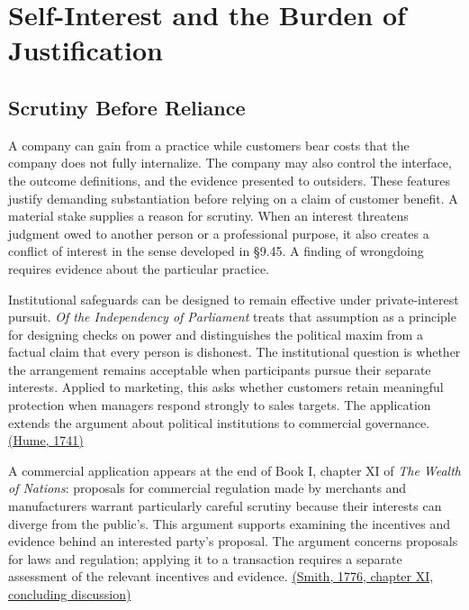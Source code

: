 
\hypertarget{M09-self-interest-and-the-burden-of-justification}{%
\section{Self-Interest and the Burden of
Justification}\label{M09-self-interest-and-the-burden-of-justification}}

\noindent \hypertarget{M09-scrutiny-before-reliance}{%
\subsection{Scrutiny Before
Reliance}\label{M09-scrutiny-before-reliance}}

\noindent \noindent A company can gain from a practice while customers bear costs
that the company does not fully internalize. The company may also
control the interface, the outcome definitions, and the evidence
presented to outsiders. These features justify demanding substantiation
before relying on a claim of customer benefit. A material stake supplies
a reason for scrutiny. When an interest threatens judgment owed to
another person or a professional purpose, it also creates a conflict of
interest in the sense developed in §9.45. A finding of wrongdoing
requires evidence about the particular practice.

Institutional safeguards can be designed to remain effective under
private-interest pursuit. \emph{Of the Independency of Parliament}
treats that assumption as a principle for designing checks on power and
distinguishes the political maxim from a factual claim that every person
is dishonest. The institutional question is whether the arrangement
remains acceptable when participants pursue their separate interests.
Applied to marketing, this asks whether customers retain meaningful
protection when managers respond strongly to sales targets. The
application extends the argument about political institutions to
commercial governance. \href{https://davidhume.org/texts/emp/ip}{(Hume,
1741)}

A commercial application appears at the end of Book I, chapter XI of
\emph{The Wealth of Nations}: proposals for commercial regulation made
by merchants and manufacturers warrant particularly careful scrutiny
because their interests can diverge from the public's. This argument
supports examining the incentives and evidence behind an interested
party's proposal. The argument concerns proposals for laws and
regulation; applying it to a transaction requires a separate assessment
of the relevant incentives and evidence.
\href{https://www.gutenberg.org/files/3300/3300-h/3300-h.htm}{(Smith,
1776, chapter XI, concluding discussion)}


